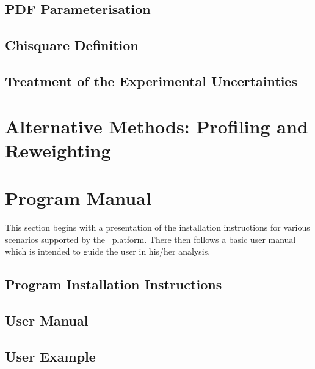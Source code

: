 \documentclass[11pt,twoside,a4paper]{article}
\begin{document}
\subsection{PDF Parameterisation}


\subsection{Chisquare  Definition}


\subsection{Treatment of the Experimental Uncertainties}
\label{sec:error}


\section{Alternative Methods: Profiling and Reweighting }
\label{sec:reweighting}
 



\newpage
\section{Program Manual}
\label{sec:progman}
This section begins with a presentation of the installation instructions for various scenarios supported by the \fitter\ platform.
There then follows a basic user manual which is intended to guide the user in his/her analysis.

\subsection{Program Installation Instructions} 

\subsection{User Manual}

\subsection{User Example}



\appendix
%
\end{document}

